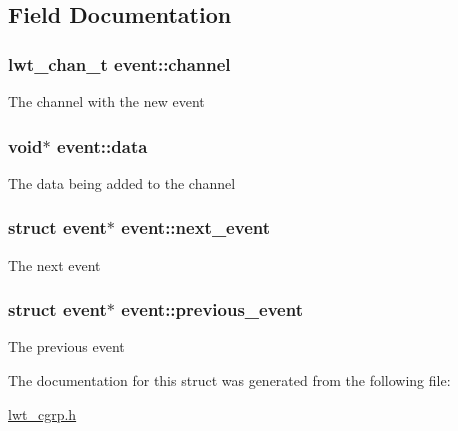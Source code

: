 \subsection{Field Documentation}
\hypertarget{structevent_a7d2dcbd71bee4021618e8b1cf852b8e3}{
\subsubsection[{channel}]{\setlength{\rightskip}{0pt plus 5cm}lwt\+\_\+chan\+\_\+t event\+::channel}}\label{structevent_a7d2dcbd71bee4021618e8b1cf852b8e3}
The channel with the new event \hypertarget{structevent_a675355462c32d49a652673799ca24209}{
\subsubsection[{data}]{\setlength{\rightskip}{0pt plus 5cm}void$\ast$ event\+::data}}\label{structevent_a675355462c32d49a652673799ca24209}
The data being added to the channel \hypertarget{structevent_a34f5ba824f03b478ad50920c7dde88b9}{
\subsubsection[{next\+\_\+event}]{\setlength{\rightskip}{0pt plus 5cm}struct {\bf event}$\ast$ event\+::next\+\_\+event}}\label{structevent_a34f5ba824f03b478ad50920c7dde88b9}
The next event \hypertarget{structevent_a7ca44afd32b2c7108a326bf985ad42f7}{
\subsubsection[{previous\+\_\+event}]{\setlength{\rightskip}{0pt plus 5cm}struct {\bf event}$\ast$ event\+::previous\+\_\+event}}\label{structevent_a7ca44afd32b2c7108a326bf985ad42f7}
The previous event 

The documentation for this struct was generated from the following file\+:\begin{DoxyCompactItemize}
\item 
\hyperlink{lwt__cgrp_8h}{lwt\+\_\+cgrp.\+h}\end{DoxyCompactItemize}

